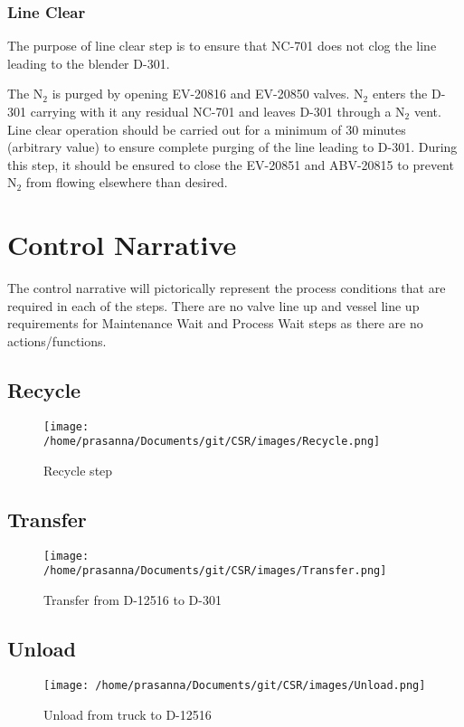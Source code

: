 \documentclass[a4paper,oneside]{article}
\begin{document}
\subsubsection{Line Clear}
\label{sec:orgccda202}
The purpose of line clear step is to ensure that NC-701 does not clog
the line leading to the blender D-301.

The N\(_{\text{2}}\) is purged by opening EV-20816 and EV-20850 valves. N\(_{\text{2}}\)
enters the D-301 carrying with it any residual NC-701 and leaves D-301
through a N\(_{\text{2}}\) vent. Line clear operation should be carried out for a
minimum of 30 minutes (arbitrary value) to ensure complete purging of
the line leading to D-301. During this step, it should be ensured to
close the EV-20851 and ABV-20815 to prevent N\(_{\text{2}}\) from flowing
elsewhere than desired.
\section{Control Narrative}
\label{sec:org43614b0}
The control narrative will pictorically represent the process
conditions that are required in each of the steps. There are no valve
line up and vessel line up requirements for Maintenance Wait and
Process Wait steps as there are no actions/functions.
\subsection{Recycle}
\label{sec:org6856a48}
\begin{figure}[htbp]
\centering
\texttt{[image: /home/prasanna/Documents/git/CSR/images/Recycle.png]}
\caption{Recycle step}
\end{figure}


\subsection{Transfer}
\label{sec:org0b12ac7}
\begin{figure}[htbp]
\centering
\texttt{[image: /home/prasanna/Documents/git/CSR/images/Transfer.png]}
\caption{Transfer from D-12516 to D-301}
\end{figure}
\subsection{Unload}
\label{sec:orge403f12}
\begin{figure}[htbp]
\centering
\texttt{[image: /home/prasanna/Documents/git/CSR/images/Unload.png]}
\caption{Unload from truck to D-12516}
\end{figure}
\end{document}
